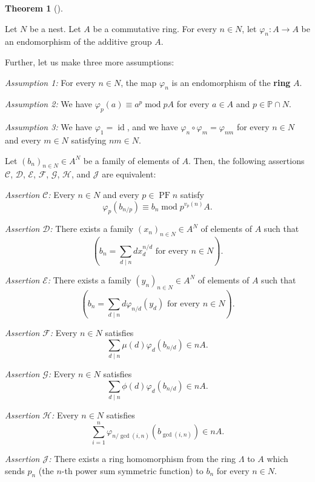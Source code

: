 \documentclass[numbers=enddot,12pt,final,onecolumn,notitlepage]{scrartcl}%
\theoremstyle{definition}
\newtheorem{theo}{Theorem}[section]
\newenvironment{theorem}[1][]
{\begin{theo}[#1]\begin{leftbar}}
{\end{leftbar}\end{theo}}
\let\sumnonlimits\sum
\renewcommand{\sum}{\sumnonlimits\limits}
\begin{document}
\begin{theorem}
\label{thm.gW}Let $N$ be a nest. Let $A$ be a commutative ring. For every
$n\in N$, let $\varphi_{n}:A\rightarrow A$ be an endomorphism of the additive
group $A$.

Further, let us make three more assumptions:

\textit{Assumption 1:} For every $n\in N$, the map $\varphi_{n}$ is an
endomorphism of the \textbf{ring} $A$.

\textit{Assumption 2:} We have $\varphi_{p}\left(  a\right)  \equiv
a^{p}\operatorname{mod}pA$ for every $a\in A$ and $p\in\mathbb{P}\cap N$.

\textit{Assumption 3:} We have $\varphi_{1}=\operatorname*{id}$, and we have
$\varphi_{n}\circ\varphi_{m}=\varphi_{nm}$ for every $n\in N$ and every $m\in
N$ satisfying $nm\in N$.

Let $\left(  b_{n}\right)  _{n\in N}\in A^{N}$ be a family of elements of $A$.
Then, the following assertions $\mathcal{C}$, $\mathcal{D}$, $\mathcal{E}$,
$\mathcal{F}$, $\mathcal{G}$, $\mathcal{H}$, and $\mathcal{J}$ are equivalent:

\textit{Assertion }$\mathcal{C}$\textit{:} Every $n\in N$ and every
$p\in\operatorname{PF}n$ satisfy%
\[
\varphi_{p}\left(  b_{n / p}\right)  \equiv b_{n}\operatorname{mod}%
p^{v_{p}\left(  n\right)  }A.
\]


\textit{Assertion }$\mathcal{D}$\textit{:} There exists a family $\left(
x_{n}\right)  _{n\in N}\in A^{N}$ of elements of $A$ such that%
\[
\left(  b_{n}=\sum_{d\mid n}dx_{d}^{n / d}\text{ for every }n\in N\right)  .
\]


\textit{Assertion }$\mathcal{E}$\textit{:} There exists a family $\left(
y_{n}\right)  _{n\in N}\in A^{N}$ of elements of $A$ such that%
\[
\left(  b_{n}=\sum_{d\mid n}d\varphi_{n / d}\left(  y_{d}\right)  \text{ for
every }n\in N\right)  .
\]


\textit{Assertion }$\mathcal{F}$\textit{:} Every $n\in N$ satisfies%
\[
\sum_{d\mid n}\mu\left(  d\right)  \varphi_{d}\left(  b_{n / d}\right)  \in
nA.
\]


\textit{Assertion }$\mathcal{G}$\textit{:} Every $n\in N$ satisfies%
\[
\sum_{d\mid n}\phi\left(  d\right)  \varphi_{d}\left(  b_{n / d}\right)  \in
nA.
\]


\textit{Assertion }$\mathcal{H}$\textit{:} Every $n\in N$ satisfies%
\[
\sum_{i=1}^{n}\varphi_{n / \gcd\left(  i,n\right)  }\left(  b_{\gcd\left(
i,n\right)  }\right)  \in nA.
\]


\textit{Assertion $\mathcal{J}$:} There exists a ring homomorphism from the
ring $\Lambda$ to $A$ which sends $p_{n}$ (the $n$-th power sum symmetric
function) to $b_{n}$ for every $n\in N$.
\end{theorem}
\end{document}
